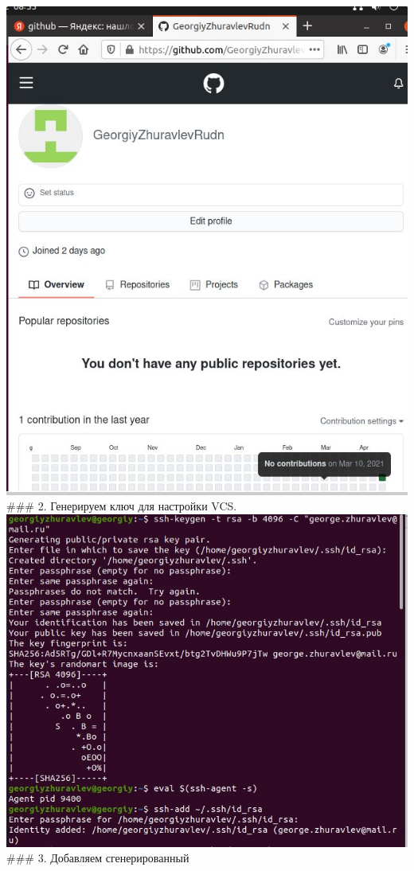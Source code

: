 \includegraphics{scrsht/1.jpg} \#\#\# 2. Генерируем ключ для настройки
VCS. \includegraphics{scrsht/2.jpg} \#\#\# 3. Добавляем сгенерированный
